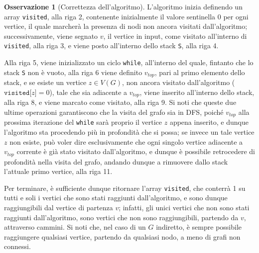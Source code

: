 \documentclass[14pt]{extreport}
\theoremstyle{definition}
\theoremstyle{definition}
\newtheorem{remark}{Osservazione}[subsection]
\begin{document}
\begin{remark}[Correttezza dell'algoritmo]
    L'algoritmo inizia definendo un array \texttt{visited}, alla riga 2, contenente inizialmente il valore sentinella 0 per ogni vertice, il quale marcherà la presenza di nodi non ancora visitati dall'algoritmo; successivamente, viene segnato $v$, il vertice in input, come visitato all'interno di \texttt{visited}, alla riga 3, e viene posto all'interno dello stack \texttt{S}, alla riga 4.

    Alla riga 5, viene inizializzato un ciclo \texttt{while}, all'interno del quale, fintanto che lo stack \texttt{S} non è vuoto, alla riga 6 viene definito $v_{top}$, pari al primo elemento dello stack, e se esiste un vertice $z \in V(G)$, non ancora visitato dall'algoritmo ($\texttt{visited[}z\texttt{]}=0$), tale che sia adiacente a $v_{top}$, viene inserito all'interno dello stack, alla riga 8, e viene marcato come visitato, alla riga 9. Si noti che queste due ultime operazioni garantiscono che la visita del grafo sia in DFS, poiché $v_{top}$ alla prossima iterazione del \texttt{while} sarà proprio il vertice $z$ appena inserito, e dunque l'algoritmo sta procedendo più in profondità che si possa; se invece un tale vertice $z$ non esiste, può voler dire esclusivamente che ogni singolo vertice adiacente a $v_{top}$ corrente è già stato visitato dall'algoritmo, e dunque è possibile retrocedere di profondità nella visita del grafo, andando dunque a rimuovere dallo stack l'attuale primo vertice, alla riga 11.

    Per terminare, è sufficiente dunque ritornare l'array \texttt{visited}, che conterrà 1 su tutti e soli i vertici che sono stati raggiunti dall'algoritmo, e sono dunque raggiungibili dal vertice di partenza $v$; infatti, gli unici vertici che non sono stati raggiunti dall'algoritmo, sono vertici che non sono raggiungibili, partendo da $v$, attraverso cammini. Si noti che, nel caso di un $G$ indiretto, è sempre possibile raggiungere qualsiasi vertice, partendo da qualsiasi nodo, a meno di grafi non connessi.
\end{remark}
\end{document}
